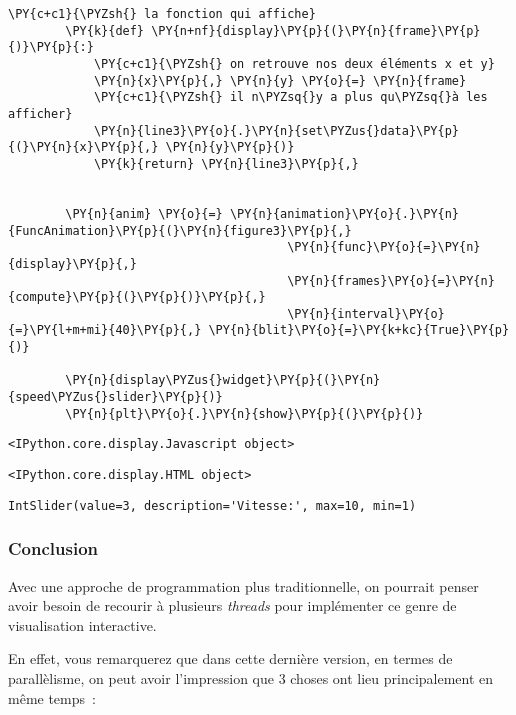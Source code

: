 \begin{Verbatim}[commandchars=\\\{\},frame=single,framerule=0.3mm,rulecolor=\color{cellframecolor}]
        \PY{c+c1}{\PYZsh{} la fonction qui affiche}
        \PY{k}{def} \PY{n+nf}{display}\PY{p}{(}\PY{n}{frame}\PY{p}{)}\PY{p}{:}
            \PY{c+c1}{\PYZsh{} on retrouve nos deux éléments x et y}
            \PY{n}{x}\PY{p}{,} \PY{n}{y} \PY{o}{=} \PY{n}{frame}
            \PY{c+c1}{\PYZsh{} il n\PYZsq{}y a plus qu\PYZsq{}à les afficher}
            \PY{n}{line3}\PY{o}{.}\PY{n}{set\PYZus{}data}\PY{p}{(}\PY{n}{x}\PY{p}{,} \PY{n}{y}\PY{p}{)}
            \PY{k}{return} \PY{n}{line3}\PY{p}{,}
        
        
        \PY{n}{anim} \PY{o}{=} \PY{n}{animation}\PY{o}{.}\PY{n}{FuncAnimation}\PY{p}{(}\PY{n}{figure3}\PY{p}{,}
                                       \PY{n}{func}\PY{o}{=}\PY{n}{display}\PY{p}{,}
                                       \PY{n}{frames}\PY{o}{=}\PY{n}{compute}\PY{p}{(}\PY{p}{)}\PY{p}{,}
                                       \PY{n}{interval}\PY{o}{=}\PY{l+m+mi}{40}\PY{p}{,} \PY{n}{blit}\PY{o}{=}\PY{k+kc}{True}\PY{p}{)}
        
        \PY{n}{display\PYZus{}widget}\PY{p}{(}\PY{n}{speed\PYZus{}slider}\PY{p}{)}
        \PY{n}{plt}\PY{o}{.}\PY{n}{show}\PY{p}{(}\PY{p}{)}
\end{Verbatim}


    
    \begin{verbatim}
<IPython.core.display.Javascript object>
    \end{verbatim}

    
    
    \begin{verbatim}
<IPython.core.display.HTML object>
    \end{verbatim}

    
    
    \begin{verbatim}
IntSlider(value=3, description='Vitesse:', max=10, min=1)
    \end{verbatim}

    
    \hypertarget{conclusion}{%
\subsubsection{Conclusion}\label{conclusion}}

    Avec une approche de programmation plus traditionnelle, on pourrait
penser avoir besoin de recourir à plusieurs \emph{threads} pour
implémenter ce genre de visualisation interactive.

En effet, vous remarquerez que dans cette dernière version, en termes de
parallèlisme, on peut avoir l'impression que 3 choses ont lieu
principalement en même temps~:

